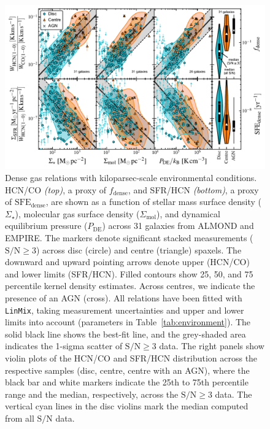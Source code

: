 \documentclass[letter, longauth]{aa} %
\newcommand*{\sigmol}{\ensuremath{\Sigma_{\text{mol}}}\xspace}  %
\newcommand*{\pde}{\ensuremath{P_{\text{DE}}}\xspace}  %
\newcommand*{\fdense}{\ensuremath{f_{\text{dense}}}\xspace}  %
\newcommand*{\sfedense}{\ensuremath{\text{SFE}_{\text{dense}}}\xspace}  %
\newcommand*{\sigstar}{\ensuremath{\Sigma_{\star}}\xspace}  %
\newcommand*{\snr}{\ensuremath{\mathrm{S}/\mathrm{N}}\xspace}  %
\begin{document}
\begin{figure}
\centering
\includegraphics[width=\textwidth]{Figures/HCN_scaling_relations_centre_vs_disc_compressed_v2.pdf}
\caption{Dense gas relations with kiloparsec-scale environmental conditions. 
HCN/CO \textit{(top)}, a proxy of \fdense, and SFR/HCN \textit{(bottom)}, a proxy of \sfedense, are shown as a function of stellar mass surface density (\sigstar), molecular gas surface density (\sigmol), and dynamical equilibrium pressure (\pde) across 31 galaxies from ALMOND and EMPIRE.
The markers denote significant stacked measurements  ($\snr\geq 3$) across disc (circle) and centre (triangle) spaxels.
The downward and upward pointing arrows denote upper (HCN/CO) and lower limits (SFR/HCN).
Filled contours show 25, 50, and 75 percentile kernel density estimates.
Across centres, we indicate the presence of an AGN (cross).
All relations have been fitted with \texttt{LinMix}, taking measurement uncertainties and upper and lower limits into account (parameters in Table~\ref{tab:environment}).
The solid black line shows the best-fit line, and the grey-shaded area indicates the 1-sigma scatter of $\snr\geq 3$ data.
The right panels show violin plots of the HCN/CO and SFR/HCN distribution across the respective samples (disc, centre, centre with an AGN), where the black bar and white markers indicate the 25th to 75th percentile range and the median, respectively, across the $\snr\geq 3$ data.
The vertical cyan lines in the disc violins mark the median computed from all \snr data.
}
\label{fig:hcn_scaling_relations}
\end{figure}
\end{document}
